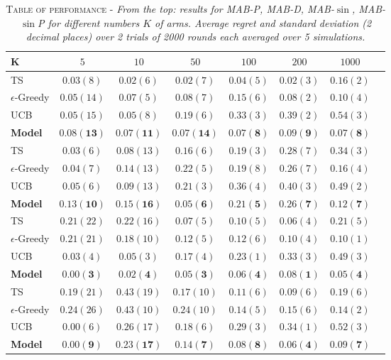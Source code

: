 \begin{table}[ht]
\centering
\begin{tabular}{l c c c c c c c}
\toprule
\textbf{K} & \textbf{$5$} & \textbf{$10$} & \textbf{$50$} & \textbf{$100$} & \textbf{$200$} & \textbf{$1000$}\\
\midrule
TS & $0.03(8)$ & $0.02(6)$ & $0.02(7)$ & $0.04(5)$ & $0.02(3)$ & $0.16(2)$ \\
$\epsilon$-Greedy & $0.05(14)$ & $0.07(5)$ & $0.08(7)$ & $0.15(6)$ & $0.08(2)$ & $0.10(4)$ \\
UCB & $0.05(15)$ & $0.05(8)$ & $0.19(6)$ & $0.33(3)$ & $0.39(2)$ & $0.54(3)$ \\
\textbf{Model} & $\mathbf{0.08(13)}$ & $\mathbf{0.07(11)}$ & $\mathbf{0.07(14)}$ & $\mathbf{0.07(8)}$ & $\mathbf{0.09(9)}$ & $\mathbf{0.07(8)}$ \\

\midrule
TS & $0.03(6)$ & $0.08(13)$ & $0.16(6)$ & $0.19(3)$ & $0.28(7)$ & $0.34(3)$ \\
$\epsilon$-Greedy & $0.04(7)$ & $0.14(13)$ & $0.22(5)$ & $0.19(8)$ & $0.26(7)$ & $0.16(4)$ \\
UCB & $0.05(6)$ & $0.09(13)$ & $0.21(3)$ & $0.36(4)$ & $0.40(3)$ & $0.49(2)$ \\
\textbf{Model} & $\mathbf{0.13(10)}$ & $\mathbf{0.15(16)}$ & $\mathbf{0.05(6)}$ & $\mathbf{0.21(5)}$ & $\mathbf{0.26(7)}$ & $\mathbf{0.12(7)}$ \\

\midrule
TS & $0.21(22)$ & $0.22(16)$ & $0.07(5)$ & $0.10(5)$ & $0.06(4)$ & $0.21(5)$ \\
$\epsilon$-Greedy & $0.21(21)$ & $0.18(10)$ & $0.12(5)$ & $0.12(6)$ & $0.10(4)$ & $0.10(1)$ \\
UCB & $0.03(4)$ & $0.05(3)$ & $0.17(4)$ & $0.23(1)$ & $0.33(3)$ & $0.49(3)$ \\
\textbf{Model} & $\mathbf{0.00(3)}$ & $\mathbf{0.02(4)}$ & $\mathbf{0.05(3)}$ & $\mathbf{0.06(4)}$ & $\mathbf{0.08(1)}$ & $\mathbf{0.05(4)}$ \\

\midrule
TS & $0.19(21)$ & $0.43(19)$ & $0.17(10)$ & $0.11(6)$ & $0.09(6)$ & $0.19(6)$ \\
$\epsilon$-Greedy & $0.24(26)$ & $0.43(10)$ & $0.24(10)$ & $0.14(5)$ & $0.15(6)$ & $0.14(2)$ \\
UCB & $0.00(6)$ & $0.26(17)$ & $0.18(6)$ & $0.29(3)$ & $0.34(1)$ & $0.52(3)$ \\
\textbf{Model} & $\mathbf{0.00(9)}$ & $\mathbf{0.23(17)}$ & $\mathbf{0.14(7)}$ & $\mathbf{0.08(8)}$ & $\mathbf{0.06(4)}$ & $\mathbf{0.09(7)}$ \\
\bottomrule
\end{tabular}
\hfill \break
\caption{\textsc{Table of performance} - \textit{From the top: results for MAB-P, MAB-D, MAB-$\sin$, MAB-$\sin$P for different numbers $K$ of arms. Average regret and standard deviation (2 decimal places) over 2 trials of 2000 rounds each averaged over 5 simulations.}}
\end{table}\label{tab:results}


